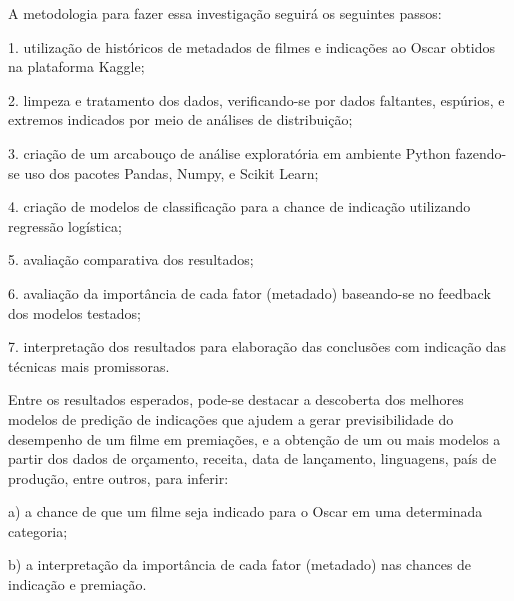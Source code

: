 A metodologia para fazer essa investigação seguirá os seguintes passos:\par

1. utilização de históricos de metadados de filmes e indicações ao Oscar obtidos na plataforma Kaggle;\par
2. limpeza e tratamento dos dados, verificando-se por dados faltantes, espúrios, e extremos indicados por meio de análises de distribuição;\par
3. criação de um arcabouço de análise exploratória em ambiente Python fazendo-se uso dos pacotes Pandas, Numpy, e Scikit Learn;\par
4. criação de modelos de classificação para a chance de indicação utilizando regressão logística;\par
5. avaliação comparativa dos resultados;\par
6. avaliação da importância de cada fator (metadado) baseando-se no feedback dos modelos testados;\par
7. interpretação dos resultados para elaboração das conclusões com indicação das técnicas mais promissoras.\par
\par

Entre os resultados esperados, pode-se destacar a descoberta dos melhores modelos de predição de indicações que ajudem a gerar previsibilidade do desempenho de um filme em premiações, e a obtenção de um ou mais modelos a partir dos dados de orçamento, receita, data de lançamento, linguagens, país de produção, entre outros, para inferir:\par

a) a chance de que um filme seja indicado para o Oscar em uma determinada categoria;\par
b) a interpretação da importância de cada fator (metadado) nas chances de indicação e premiação.\par
